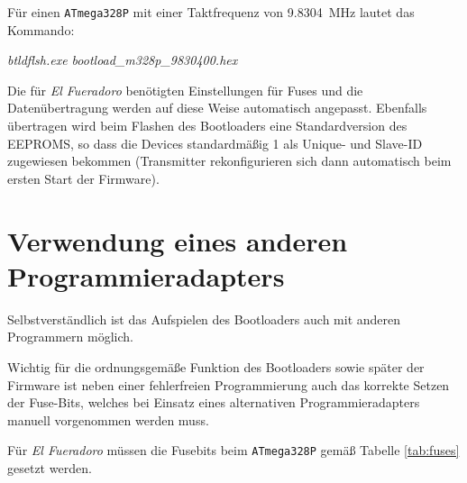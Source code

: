 \documentclass[paper=a4, parskip, numbers=noenddot, toc=listof, headsepline]{scrbook}
\newcommand{\anlage}{\emph{El Fueradoro}}
\begin{document}
			Für einen \texttt{ATmega328P} mit einer Taktfrequenz von \SI{9,8304}{\mega\hertz} lautet das Kommando:

			\begin{center}
				\emph{btldflsh.exe bootload\_m328p\_9830400.hex}
			\end{center}

			Die für {\anlage} benötigten Einstellungen für Fuses und die Datenübertragung werden auf diese Weise automatisch angepasst. Ebenfalls übertragen wird beim Flashen des Bootloaders eine Standardversion des EEPROMS, so dass die Devices standardmäßig 1 als Unique- und Slave-ID zugewiesen bekommen (Transmitter rekonfigurieren sich dann automatisch beim ersten Start der Firmware).

		\section{Verwendung eines anderen Programmieradapters}

			Selbstverständlich ist das Aufspielen des Bootloaders auch mit anderen Programmern möglich.

			Wichtig für die ordnungsgemäße Funktion des Bootloaders sowie später der Firmware ist neben einer fehlerfreien Programmierung auch das korrekte Setzen der Fuse-Bits, welches bei Einsatz eines alternativen Programmieradapters manuell vorgenommen werden muss.

			Für {\anlage} müssen die Fusebits beim \texttt{ATmega328P} gemäß Tabelle \ref{tab:fuses} gesetzt werden.
\end{document}
